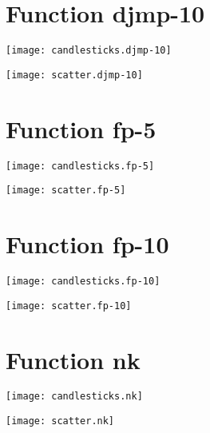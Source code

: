 \section{Function djmp-10}
\begin{center}

\end{center}
\begin{center}
\texttt{[image: candlesticks.djmp-10]}
\end{center}
\begin{center}
\texttt{[image: scatter.djmp-10]}
\end{center}
\begin{center}

\end{center}
\newpage
\section{Function fp-5}
\begin{center}

\end{center}
\begin{center}
\texttt{[image: candlesticks.fp-5]}
\end{center}
\begin{center}
\texttt{[image: scatter.fp-5]}
\end{center}
\begin{center}

\end{center}
\newpage
\section{Function fp-10}
\begin{center}

\end{center}
\begin{center}
\texttt{[image: candlesticks.fp-10]}
\end{center}
\begin{center}
\texttt{[image: scatter.fp-10]}
\end{center}
\begin{center}

\end{center}
\newpage
\section{Function nk}
\begin{center}

\end{center}
\begin{center}
\texttt{[image: candlesticks.nk]}
\end{center}
\begin{center}
\texttt{[image: scatter.nk]}
\end{center}
\begin{center}

\end{center}
\newpage
